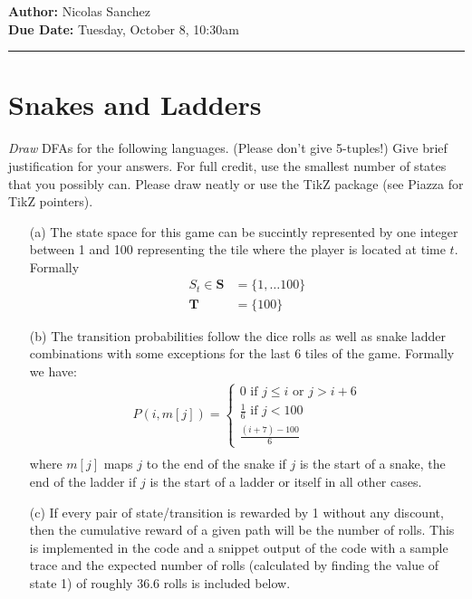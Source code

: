 \documentclass{article}[12pt]
\newcommand{\headings}[4]{\noindent {\bf Assignment 2 CME241} \hfill {{\bf Author:} Nicolas Sanchez} \\
{} \hfill {{\bf Due Date:} #2} \\

\rule[0.1in]{\textwidth}{0.025in}
}
\begin{document}
\headings{\#1}{Tuesday, October 8, 10:30am}\section{} 



\section{Snakes and Ladders}

{\em Draw} DFAs for the following languages. (Please don't give 5-tuples!) Give brief justification for your answers. For full credit, use the smallest number of states that you possibly can. Please draw neatly or use the TikZ package (see Piazza for TikZ pointers).

\begin{itemize}
\item[(a)] The state space for this game can be succintly represented by one integer between 1 and 100 representing the tile where the player is located at time $t$. Formally
\begin{align*}
S_t \in \mathbf{S}& =\{1,\ldots 100\}\\
\mathbf{T}& = \{100\}
\end{align*} 
\item[(b)] The transition probabilities follow the dice rolls as well as snake ladder combinations with some exceptions for the last 6 tiles of the game. Formally we have:
\begin{align*}
P(i,m[j]) =  \begin{cases} 0 \text{ if $j\leq i$ or $j> i+6$}\\ \frac{1}{6} \text{ if $j<100$} \\ \frac{(i+7)-100}{6} \end{cases}\\
\end{align*} 
where $m[j]$ maps $j$ to the end of the snake if $j$ is the start of a snake, the end of the ladder if $j$ is the start of a ladder or itself in all other cases.\\


\item[(c)]  If every pair of state/transition is rewarded by 1 without any discount, then the cumulative reward of a given path will be the number of rolls. This is implemented in the code and a snippet output of the code with a sample trace and the expected number of rolls (calculated by finding the value of state 1) of roughly 36.6 rolls is included below.




\end{itemize}
\end{document}
